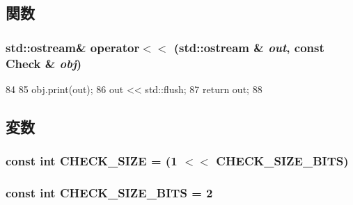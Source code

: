 \subsection{関数}
\hypertarget{Check_8hh_ad904cac29a8613c671ee484b326cbcaa}{
\subsubsection[{operator$<$$<$}]{\setlength{\rightskip}{0pt plus 5cm}std::ostream\& operator$<$$<$ (std::ostream \& {\em out}, \/  const {\bf Check} \& {\em obj})}}
\label{Check_8hh_ad904cac29a8613c671ee484b326cbcaa}



\begin{DoxyCode}
84 {
85     obj.print(out);
86     out << std::flush;
87     return out;
88 }
\end{DoxyCode}


\subsection{変数}
\hypertarget{Check_8hh_a9a4e4d92b84c20d87d22cd139b0781d9}{
\subsubsection[{CHECK\_\-SIZE}]{\setlength{\rightskip}{0pt plus 5cm}const int {\bf CHECK\_\-SIZE} = (1 $<$$<$ {\bf CHECK\_\-SIZE\_\-BITS})}}
\label{Check_8hh_a9a4e4d92b84c20d87d22cd139b0781d9}
\hypertarget{Check_8hh_ab082b7c215fc32d2bcf27291d93a616d}{
\subsubsection[{CHECK\_\-SIZE\_\-BITS}]{\setlength{\rightskip}{0pt plus 5cm}const int {\bf CHECK\_\-SIZE\_\-BITS} = 2}}
\label{Check_8hh_ab082b7c215fc32d2bcf27291d93a616d}
